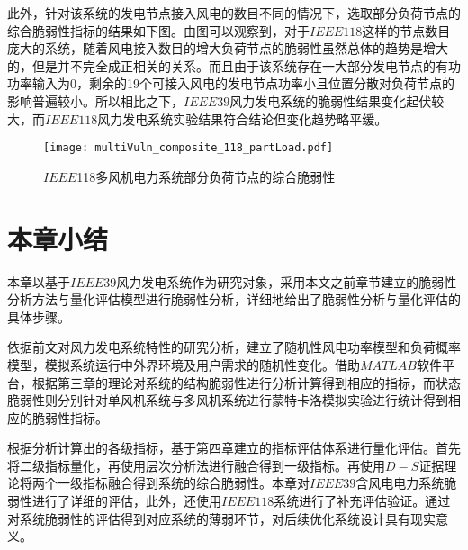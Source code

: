 此外，针对该系统的发电节点接入风电的数目不同的情况下，选取部分负荷节点的综合脆弱性指标的结果如下图。由图可以观察到，对于$IEEE118$这样的节点数目庞大的系统，随着风电接入数目的增大负荷节点的脆弱性虽然总体的趋势是增大的，但是并不完全成正相关的关系。而且由于该系统存在一大部分发电节点的有功功率输入为0，剩余的19个可接入风电的发电节点功率小且位置分散对负荷节点的影响普遍较小。所以相比之下，$IEEE39$风力发电系统的脆弱性结果变化起伏较大，而$IEEE118$风力发电系统实验结果符合结论但变化趋势略平缓。
\begin{figure}[H] %
  \centering
  \texttt{[image: multiVuln\_composite\_118\_partLoad.pdf]}
  \caption{$IEEE$118多风机电力系统部分负荷节点的综合脆弱性}
  \label{fig:118model}
\end{figure}

\section{本章小结}
\label{sec:sum5}
本章以基于$IEEE39$风力发电系统作为研究对象，采用本文之前章节建立的脆弱性分析方法与量化评估模型进行脆弱性分析，详细地给出了脆弱性分析与量化评估的具体步骤。

依据前文对风力发电系统特性的研究分析，建立了随机性风电功率模型和负荷概率模型，模拟系统运行中外界环境及用户需求的随机性变化。借助$MATLAB$软件平台，根据第三章的理论对系统的结构脆弱性进行分析计算得到相应的指标，而状态脆弱性则分别针对单风机系统与多风机系统进行蒙特卡洛模拟实验进行统计得到相应的脆弱性指标。

根据分析计算出的各级指标，基于第四章建立的指标评估体系进行量化评估。首先将二级指标量化，再使用层次分析法进行融合得到一级指标。再使用$D-S$证据理论将两个一级指标融合得到系统的综合脆弱性。本章对$IEEE39$含风电电力系统脆弱性进行了详细的评估，此外，还使用$IEEE118$系统进行了补充评估验证。通过对系统脆弱性的评估得到对应系统的薄弱环节，对后续优化系统设计具有现实意义。

